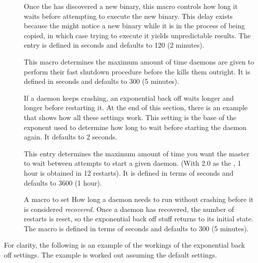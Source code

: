 \begin{description}
\item[]
  \label{param:MasterNewBinaryDelay} Once the  has
  discovered a new binary, this macro controls how long it waits
  before attempting to execute the new binary.  This delay exists
  because the  might notice a new binary while it
  is in the process of being copied,
  in which case trying to execute it yields
  unpredictable results.  The entry is defined in seconds and
  defaults to 120 (2 minutes).

\item[]
  \label{param:ShutdownFastTimeout} This macro determines the maximum
  amount of time daemons are given to perform their
  fast shutdown procedure before the  kills them
  outright.  It is defined in seconds and defaults to 300 (5 minutes).

\item[]
  \label{param:MasterBackoffFactor} If a daemon keeps crashing, an
  exponential back off waits longer and longer before
  restarting it.  At the end of this section, there is an example that
  shows how all these settings work.  This setting is the base of the
  exponent used to determine how long to wait before starting the
  daemon again.  It defaults to 2 seconds.

\item[]
  \label{param:MasterBackoffCeiling} This entry determines the maximum
  amount of time you want the master to wait between attempts to start
  a given daemon.  (With 2.0 as the ,
  1 hour is obtained in 12 restarts).  It is defined in terms of
  seconds and defaults to 3600 (1 hour).

\item[]
  \label{param:MasterRecoverFactor}  A macro to set How long a daemon 
  needs to run without crashing before it is considered \emph{recovered}.
  Once a
  daemon has recovered, the number of restarts is reset, so the
  exponential back off stuff returns to its initial state.  
  The macro is defined in
  terms of seconds and defaults to 300 (5 minutes).

\end{description}

For clarity, the following is an example of the workings of
the exponential back off settings.  The example is worked out assuming
the default settings.

